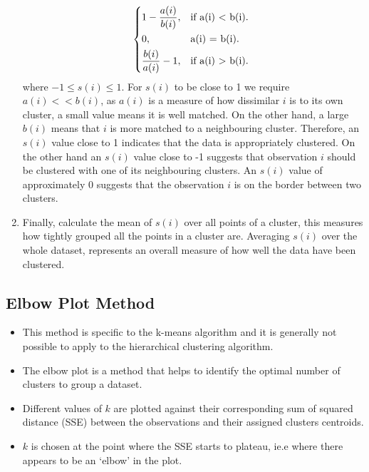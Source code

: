 \documentclass[]{article}
\begin{document}
\begin{enumerate}
\[  \begin{dcases*} 
  1 - \frac{a(i)}{b(i)}, & if a(i) $<$ b(i). \\ 
  0, & a(i) = b(i).\\
  \frac{b(i)}{a(i)} - 1, & if a(i) $>$ b(i). 
  \end{dcases*} 
\]
where $ - 1 \leq s(i) \leq 1$. For $s(i)$ to be close to 1 we require $a(i) << b(i)$, as $a(i)$ is a measure of how dissimilar $i$ is to its own cluster, a small value means it is well matched. On the other hand, a large $b(i)$ means that $i$ is more matched to a neighbouring cluster. Therefore, an $s(i)$ value close to 1 indicates that the data is appropriately clustered. On the other hand an $s(i)$ value close to -1 suggests that observation $i$ should be clustered with one of its neighbouring clusters. An $s(i)$ value of approximately 0 suggests that the observation $i$ is on the border between two clusters.  
\item Finally, calculate the mean of $s(i)$ over all points of a cluster, this measures how tightly grouped all the points in a cluster are. Averaging $s(i)$ over the whole dataset, represents an overall measure of how well the data have been clustered. 
\end{enumerate}

\subsection{Elbow Plot Method}
\begin{itemize}
	\item This method is specific to the k-means algorithm and it is generally not possible to apply to the hierarchical clustering algorithm.
	\item The elbow plot is a method that helps to identify the optimal number of clusters to group a dataset.
	\item Different values of $k$ are plotted against their corresponding sum of squared distance (SSE) between the observations and their assigned clusters centroids.
	\item $k$ is chosen at the point where the SSE starts to plateau, ie.e where there appears to be an `elbow' in the plot. 
\end{itemize}
\end{document}
